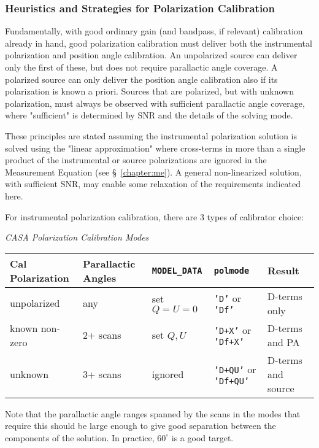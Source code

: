 \subsubsection{Heuristics and Strategies for Polarization Calibration }
\label{section:cal.solve.pol.hstics}

Fundamentally, with good ordinary gain (and bandpass, if relevant)
calibration already in hand, good polarization calibration must
deliver both the instrumental polarization and position angle
calibration.  An unpolarized source can deliver only the first of
these, but does not require parallactic angle coverage.  A polarized
source can only deliver the position angle calibration also if its
polarization is known a priori.  Sources that are polarized, but with
unknown polarization, must always be observed with sufficient
parallactic angle coverage, where "sufficient" is determined by SNR
and the details of the solving mode.

These principles are stated assuming the instrumental polarization
solution is solved using the "linear approximation" where cross-terms
in more than a single product of the instrumental or source
polarizations are ignored in the Measurement Equation (see 
\S~\ref{chapter:me}).
A general non-linearized solution, with sufficient SNR, may enable 
some relaxation of the requirements indicated here.

For instrumental polarization calibration, there are 3 types of
calibrator choice:
\begin{center}
{\it CASA Polarization Calibration Modes}\\[5mm]
\begin{tabular}{|l|l|l|l|l|}
\hline
Cal Polarization & Parallactic Angles & {\tt MODEL\_DATA} & 
    {\tt polmode} & Result \\
\hline
unpolarized & any & set $Q=U=0$ & {\tt 'D'} or {\tt 'Df'} & D-terms
  only \\
known non-zero & 2+ scans & set $Q,U$ & {\tt 'D+X'} or 
  {\tt 'Df+X'} & D-terms and PA \\
unknown & 3+ scans & ignored & {\tt 'D+QU'} or {\tt 'Df+QU'} &
  D-terms and source \\
\hline
\end{tabular}
\end{center}
Note that the parallactic angle ranges spanned by the scans in the
modes that require this should be large enough to give good separation
between the components of the solution.  In practice, $60^\circ$ is 
a good target.

